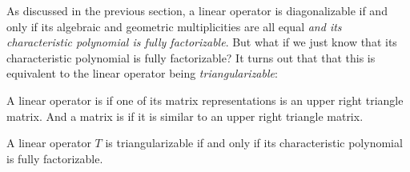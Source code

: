 As discussed in the previous section, a linear operator is diagonalizable if and only if its algebraic and geometric multiplicities are all equal \emph{and its characteristic polynomial is fully
factorizable}.
But what if we just know that its characteristic polynomial is fully factorizable?
It turns out that that this is equivalent to the linear operator being \emph{triangularizable}:

\begin{defn*}

    A linear operator is  if one of its matrix representations is an upper right triangle matrix.
    And a matrix is  if it is similar to an upper right triangle matrix.

\end{defn*}

\begin{thrm*}

    A linear operator $T$ is triangularizable if and only if its characteristic polynomial is fully factorizable.

\end{thrm*}

